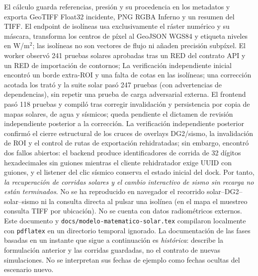 \documentclass[11pt,a4paper]{article}
\begin{document}
El cálculo guarda referencias, presión y su procedencia en los metadatos y exporta GeoTIFF Float32 incidente, PNG RGBA Inferno y un resumen del TIFF. El endpoint de isolíneas usa exclusivamente el ráster numérico y su máscara, transforma los centros de píxel al GeoJSON WGS84 y etiqueta niveles en W/m$^2$; las isolíneas no son vectores de flujo ni añaden precisión subpíxel. El worker observó 241 pruebas solares aprobadas tras un RED del contrato API y un RED de importación de contornos; La verificación independiente inicial encontró un borde extra-ROI y una falta de cotas en las isolíneas; una corrección acotada los trató y la suite solar pasó 247 pruebas (con advertencias de dependencias), sin repetir una prueba de carga adversarial externa. El frontend pasó 118 pruebas y compiló tras corregir invalidación y persistencia por copia de mapas solares, de agua y sísmicos; queda pendiente el dictamen de revisión independiente posterior a la corrección. La verificación independiente posterior confirmó el cierre estructural de los cruces de overlays DG2/sismo, la invalidación de ROI y el control de rutas de exportación rehidratadas; sin embargo, encontró dos fallos abiertos: el backend produce identificadores de corrida de 32 dígitos hexadecimales sin guiones mientras el cliente rehidratador exige UUID con guiones, y el listener del clic sísmico conserva el estado inicial del dock. Por tanto, \emph{la recuperación de corridas solares y el cambio interactivo de sismo sin recarga no están terminados}. No se ha reproducido en navegador el recorrido solar--DG2--solar--sismo ni la consulta directa al pulsar una isolínea (en el mapa el muestreo consulta TIFF por ubicación). No se cuenta con datos radiométricos externos. Este documento y \texttt{docs/modelo-matematico-solar.tex} compilaron localmente con \texttt{pdflatex} en un directorio temporal ignorado. La documentación de las fases basadas en un instante que sigue a continuación es \emph{histórica}: describe la formulación anterior y las corridas guardadas, no el contrato de nuevas simulaciones. No se interpretan sus fechas de ejemplo como fechas ocultas del escenario nuevo.
\end{document}
